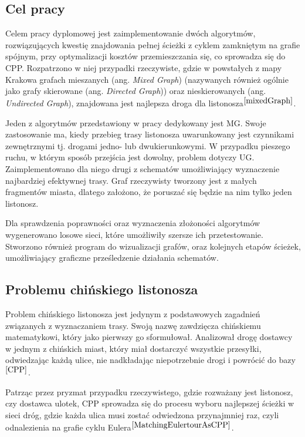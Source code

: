 \documentclass[a4paper, 12pt, twoside, openright]{article}
\begin{document}
\subsection{Cel pracy}
	\indent\par
	Celem pracy dyplomowej jest zaimplementowanie dwóch algorytmów, rozwiązujących kwestię znajdowania pełnej ścieżki z cyklem zamkniętym na grafie spójnym, przy optymalizacji kosztów przemieszczania się, co sprowadza się do CPP. 
	Rozpatrzono w niej przypadki rzeczywiste, gdzie w powstałych z mapy Krakowa grafach mieszanych (ang. \textit{Mixed Graph}) (nazywanych również ogólnie jako grafy skierowane (ang. \textit{Directed Graph})) oraz nieskierowanych (ang. \textit{Undirected Graph}), znajdowana jest najlepsza droga dla listonosza$^{\cite{mixedGraph}}$.


	Jeden z algorytmów przedstawiony w pracy dedykowany jest MG. Swoje zastosowanie ma, kiedy przebieg trasy listonosza uwarunkowany jest czynnikami zewnętrznymi tj. drogami jedno- lub dwukierunkowymi. 
	W przypadku pieszego ruchu, w którym sposób przejścia jest  dowolny, problem dotyczy UG. Zaimplementowano dla niego drugi z schematów umożliwiający wyznaczenie najbardziej efektywnej trasy. Graf rzeczywisty tworzony jest z małych fragmentów miasta, dlatego założono, że poruszać się będzie na nim tylko jeden listonosz. 

	Dla sprawdzenia poprawności oraz wyznaczenia złożoności algorytmów wygenerowano losowe sieci, które umożliwiły szersze ich przetestowanie. 
	Stworzono również program do wizualizacji grafów, oraz kolejnych etapów ścieżek, umożliwiający graficzne prześledzenie działania schematów.




\subsection{Problemu chińskiego listonosza}
	\indent\par
	Problem chińskiego listonosza jest jedynym z podstawowych zagadnień związanych z wyznaczaniem trasy. Swoją nazwę zawdzięcza chińskiemu matematykowi, który jako pierwszy go sformułował. Analizował drogę dostawcy w jednym z chińskich miast, który miał dostarczyć wszystkie przesyłki, odwiedzając każdą ulice, nie nadkładając niepotrzebnie drogi i powrócić do bazy$^{{\cite{CPP}}}$. 
	
	Patrząc przez pryzmat przypadku rzeczywistego, gdzie rozważany jest listonosz, czy dostawca ulotek, CPP sprowadza się do procesu wyboru najlepszej ścieżki w sieci dróg, gdzie  każda ulica musi zostać odwiedzona przynajmniej raz, czyli odnalezienia na grafie cyklu Eulera$^{\cite{MatchingEulertourAsCPP}}$. 
\end{document}
